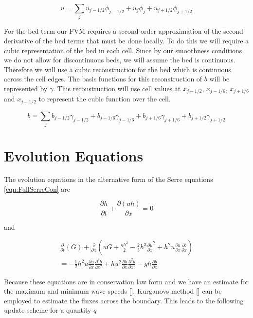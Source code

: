 \begin{equation}
u = \sum_j u_{j-1/2}\phi_{j-1/2} + u_{j}\phi_{j} + u_{j+1/2}\phi_{j+1/2}
\end{equation}



For the bed term our FVM requires a second-order approximation of the second derivative of the bed terms that must be done locally. To do this we will require a cubic representation of the bed in each cell. Since by our smoothness conditions we do not allow for discontinuous beds, we will assume the bed is continuous. Therefore we will use a cubic reconstruction for the bed which is continuous across the cell edges. The basis functions for this reconstruction of $b$ will be represented by $\gamma$. This reconstruction will use cell values at $x_{j-1/2}$, $x_{j-1/6}$, $x_{j+1/6}$ and $x_{j + 1/2}$ to represent the cubic function over the cell. 

\begin{equation}
b = \sum_j b_{j-1/2}\gamma_{j-1/2} + b_{j-1/6}\gamma_{j-1/6}  + b_{j+1/6}\gamma_{j+1/6} + b_{j+1/2}\gamma_{j+1/2}
\end{equation}
 


\section{Evolution Equations}
The evolution equations in the alternative form of the Serre equations \eqref{eqn:FullSerreCon} are

\begin{equation*}
\frac{\partial h}{\partial t} + \dfrac{\partial (uh)}{\partial x} = 0
\end{equation*}

and

\begin{multline*}
\frac{\partial}{\partial t} \left( G \right)  + \frac{\partial}{\partial x} \left( {u} G + \frac{gh^2}{2} - \frac{2}{3}h^3 \frac{\partial {u}}{\partial x}^2 + h^2 {u}\frac{\partial {u}}{\partial x}\frac{\partial b}{\partial x} \right) \\ = -\frac{1}{2}h^2 {u} \frac{\partial {u}}{\partial x} \frac{\partial^2 b}{\partial x^2}  + h {u}^2\frac{\partial b}{\partial x}\frac{\partial^2 b}{\partial x^2} - gh\frac{\partial b}{\partial x} 
\end{multline*}

Because these equations are in conservation law form and we have an estimate for the maximum and minimum wave speeds [], Kurganovs method [] can be employed to estimate the fluxes across the boundary. This leads to the following update scheme for a quantity $q$

